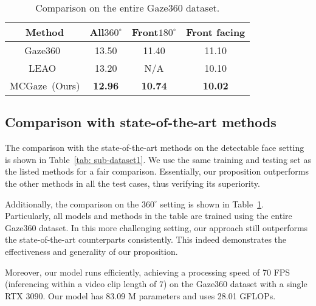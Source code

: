 \documentclass[journal]{IEEEtran}
\begin{document}
\begin{table}[t]
\setlength{\abovecaptionskip}{0cm}  \setlength{\belowcaptionskip}{-0.2cm} \caption{Comparison on the entire Gaze360 dataset.}
\centering
\tiny
\setlength{\tabcolsep}{3pt}
\begin{tabular}{c|ccc}
 \hline
Method & All$360^{\circ}$ & Front$180^{\circ}$ & Front facing \\ 
 \hline
Gaze360~\cite{kellnhofer2019gaze360} & 13.50 & 11.40 & 11.10\\
LEAO~\cite{kothari2021weakly} & 13.20 & N/A & 10.10\\
\hline
MCGaze~(Ours) & \textbf{12.96} & \textbf{10.74} & \textbf{10.02}\\
 \hline
\end{tabular}
\label{tab: all}
\vspace{-6mm}
\end{table}



\subsection{Comparison with state-of-the-art methods}
The comparison with the state-of-the-art methods on the detectable face setting is shown in Table~\ref{tab: sub-dataset1}. We use the same training and testing set as the listed methods for a fair comparison. Essentially, our proposition outperforms the other methods in all the test cases, thus verifying its superiority.

Additionally, the comparison on the $360^{\circ}$ setting is shown in Table~\ref{tab: all}. Particularly, all models and methods in the table are trained using the entire Gaze360 dataset. 
In this more challenging setting, our approach still outperforms the state-of-the-art counterparts consistently. This indeed demonstrates the effectiveness and generality of our proposition. 



Moreover, our model runs efficiently, achieving a processing speed of 70 FPS (inferencing within a video clip length of 7) on the Gaze360 dataset with a single RTX 3090. Our model has 83.09 M parameters and uses 28.01 GFLOPs.
\end{document}
